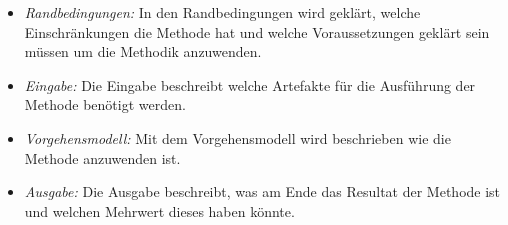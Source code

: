 \begin{itemize}
\item \textit{Randbedingungen:} In den Randbedingungen wird gekl\"art, welche Einschr\"ankungen die Methode hat und welche Voraussetzungen gekl\"art sein m\"ussen um die Methodik anzuwenden.
\item \textit{Eingabe:} Die Eingabe beschreibt welche Artefakte f\"ur die Ausf\"uhrung der Methode ben\"otigt werden.
\item \textit{Vorgehensmodell:} Mit dem Vorgehensmodell wird beschrieben wie die Methode anzuwenden ist.
\item \textit{Ausgabe:} Die Ausgabe beschreibt, was am Ende das Resultat der Methode ist und welchen Mehrwert dieses haben k\"onnte.\\
\end{itemize}




